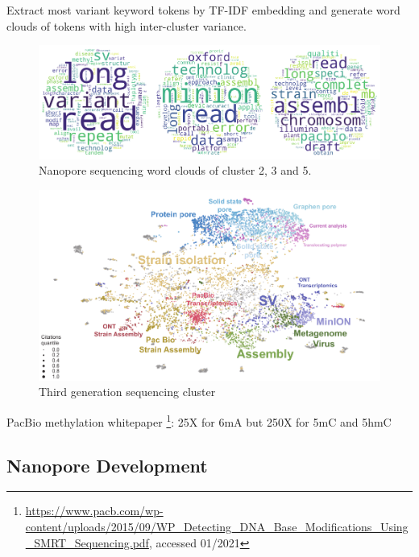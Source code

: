 Extract most variant keyword tokens by TF-IDF embedding and generate word clouds of tokens with high inter-cluster variance.

\begin{figure}[h]
	\centering
	\includegraphics[width=1.0\textwidth]{figures/state_of_art/wcs_minion.pdf}
	\captionsetup{format=plain}
	\caption[Nanopore Sequencing Wordclouds]{Nanopore sequencing word clouds of cluster 2, 3 and 5.}
	\label{fig:state_of_art:wcs_minion}
\end{figure}

\begin{figure}[h]
	\centering
	\includegraphics[width=1.0\textwidth]{figures/state_of_art/umap_cluster.pdf}
	\captionsetup{format=plain}
	\caption[Third generation sequencing cluster]{Third generation sequencing cluster}
	\label{fig:state_of_art:umap_cluster}
\end{figure}

PacBio methylation whitepaper \footnote{\url{https://www.pacb.com/wp-content/uploads/2015/09/WP_Detecting_DNA_Base_Modifications_Using_SMRT_Sequencing.pdf}, accessed 01/2021}:
25X for 6mA but 250X for 5mC and 5hmC


\subsection{Nanopore Development}
\label{subsec:state_of_art:nanopore}

